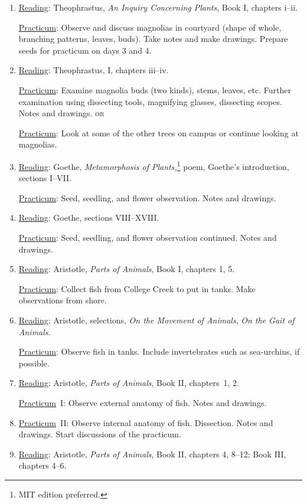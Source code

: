 \documentclass{article}
\newcommand{\rd}{\uline{Reading}}
\newcommand{\pc}{\uline{Practicum}}
\begin{document}
\begin{enumerate}

\item \rd: Theophrastus, \emph{An Inquiry Concerning Plants}, Book I, chapters i--ii.

\pc: Observe and discuss magnolias in courtyard (shape of whole, branching patterns, leaves, buds). Take notes and make drawings. Prepare seeds for practicum on days 3 and 4.

\item \rd: Theophrastus, I, chapters iii--iv.

\pc: Examine magnolia buds (two kinds), stems, leaves, etc. Further examination using dissecting tools, magnifying glasses, dissecting scopes. Notes and drawings. \textsc{or}

\pc: Look at some of the other trees on campus or continue looking at magnolias.

\item \rd: Goethe, \emph{Metamorphosis of Plants,}\footnote{MIT edition preferred.} poem, Goethe’s introduction, sections I--VII.

\pc: Seed, seedling, and flower observation. Notes and drawings.

\item \rd: Goethe, sections VIII--XVIII.

\pc: Seed, seedling, and flower observation continued. Notes and drawings.

\item \rd: Aristotle, \emph{Parts of Animals}, Book I, chapters 1, 5.

\pc: Collect fish from College Creek to put in tanks. Make observations from shore.

\item \rd: Aristotle, selections, \emph{On the Movement of Animals}, \emph{On the Gait of Animals}.

\pc: Observe fish in tanks. Include invertebrates such as sea-urchins, if possible.

\item \rd: Aristotle, \emph{Parts of Animals}, Book II, chapters\ 1, 2.

\pc\ I: Observe external anatomy of fish. Notes and drawings.

\item \pc\ II: Observe internal anatomy of fish. Dissection. Notes and drawings. Start discussions of the practicum.

\item \rd: Aristotle, \emph{Parts of Animals}, Book II, chapters 4, 8--12; Book III, chapters 4--6.


\end{enumerate}
\end{document}
